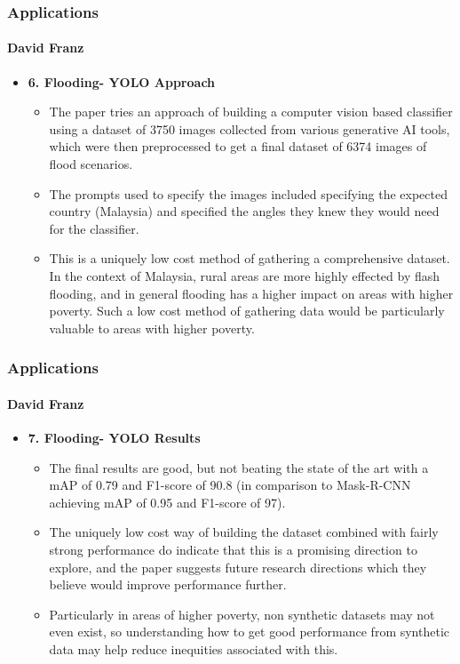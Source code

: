 \documentclass{beamer}
\newcommand{\namedframe}[3]{
  \begin{frame}
    \frametitle{#2}
    \framesubtitle{#1}
    #3
  \end{frame}
}
\begin{document}
\namedframe{David Franz}{Applications}{
\begin{itemize}
    \item \textbf{6. Flooding- YOLO Approach}
    \begin{itemize}
        \item The paper tries an approach of building a computer vision based classifier using a dataset of 3750 images collected from various generative AI tools, which were then preprocessed to get a final dataset of 6374 images of flood scenarios. 
        \item The prompts used to specify the images included specifying the expected country (Malaysia) and specified the angles they knew they would need for the classifier. 
        \item This is a uniquely low cost method of gathering a comprehensive dataset. In the context of Malaysia, rural areas are more highly effected by flash flooding, and in general flooding has a higher impact on areas with higher poverty. Such a low cost method of gathering data would be particularly valuable to areas with higher poverty.
    \end{itemize}
\end{itemize}
}

\namedframe{David Franz}{Applications}{
\begin{itemize}
    \item \textbf{7. Flooding- YOLO Results}
    \begin{itemize}
        \item The final results are good, but not beating the state of the art with a mAP of 0.79 and F1-score of 90.8 (in comparison to Mask-R-CNN achieving mAP of 0.95 and F1-score of 97). 
        \item The uniquely low cost way of building the dataset combined with fairly strong performance do indicate that this is a promising direction to explore, and the paper suggests future research directions which they believe would improve performance further. 
        \item Particularly in areas of higher poverty, non synthetic datasets may not even exist, so understanding how to get good performance from synthetic data may help reduce inequities associated with this.
    \end{itemize}
\end{itemize}
}
\end{document}
